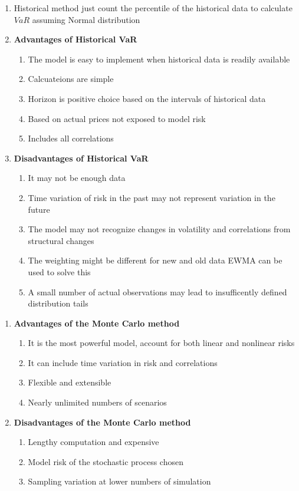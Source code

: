 \documentclass[11pt,fleqn]{book} %
\numberwithin{equation}{section} %
\numberwithin{figure}{section} %
\numberwithin{table}{section} %
\begin{document}
\begin{remark}
\begin{enumerate}
    \item Historical method just count the percentile of the historical data to calculate $VaR$ assuming Normal distribution
    \item \textbf{Advantages of Historical VaR}
    \begin{enumerate}
        \item The model is easy to implement when historical data is readily available
        \item Calcuateions are simple
        \item Horizon is positive choice based on the intervals of historical data
        \item Based on actual prices not exposed to model risk
        \item Includes all correlations
    \end{enumerate}
    \item \textbf{Disadvantages of Historical VaR}
    \begin{enumerate}
        \item It may not be enough data
        \item Time variation of risk in the past may not represent variation in the future
        \item The model may not recognize changes in volatility and correlations from structural changes
        \item The weighting might be different for new and old data EWMA can be used to solve this
        \item A small number of actual observations may lead to insufficently defined distribution tails
    \end{enumerate}
\end{enumerate}
\end{remark}
\begin{remark}
\begin{enumerate}
    \item \textbf{Advantages of the Monte Carlo method}
    \begin{enumerate}
        \item It is the most powerful model, account for both linear and nonlinear risks
        \item It can include time variation in risk and correlations
        \item Flexible and extensible
        \item Nearly unlimited numbers of scenarios
    \end{enumerate}
    \item \textbf{Disadvantages of the Monte Carlo method}
    \begin{enumerate}
        \item Lengthy computation and expensive
        \item Model risk of the stochastic process chosen
        \item Sampling variation at lower numbers of simulation
    \end{enumerate}
\end{enumerate}
\end{remark}
\end{document}
